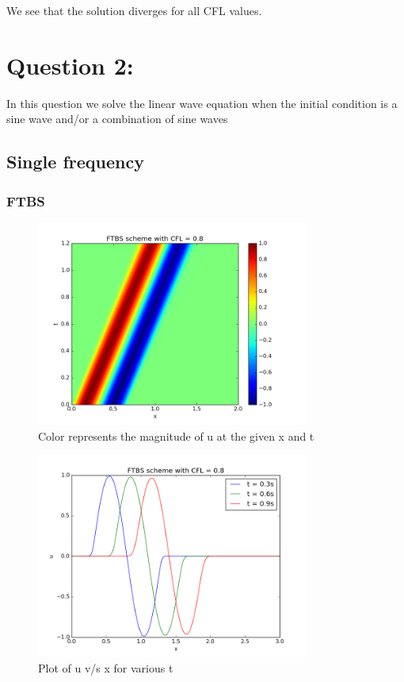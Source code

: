 \documentclass[11pt, a4paper]{article}
\begin{document}
We see that the solution diverges for all CFL values.

\section{Question 2:}
In this question we solve the linear wave equation when the initial condition is a sine wave and/or a combination of sine waves

\subsection{Single frequency}
\subsubsection{FTBS}
\begin{figure}[H]
 \centering
 \includegraphics[width = 0.8\textwidth]{FTBS2_08.png}
 \caption{Color represents the magnitude of u at the given x and t}
\end{figure}

\begin{figure}[H]
 \centering
 \includegraphics[width = 0.8\textwidth]{FTBS2_08_1.png}
 \caption{Plot of u v/s x for various t}
\end{figure}
\end{document}
